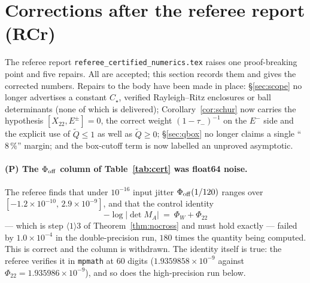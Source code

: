 \documentclass[11pt]{article}
\begin{document}
\section{Corrections after the referee report (RCr)}\label{sec:rcr}

The referee report \texttt{referee\_certified\_numerics.tex} raises one proof-breaking point and five
repairs.  All are accepted; this section records them and gives the corrected numbers.  Repairs to the
body have been made in place: \S\ref{sec:scope} no longer advertises a constant $C_\star$, verified
Rayleigh--Ritz enclosures or ball determinants (none of which is delivered);
Corollary~\ref{cor:schur} now carries the hypothesis $[X_{22},E^\pm]=0$, the correct weight
$(1-\tau_-)^{-1}$ on the $E^-$ side and the explicit use of $\widetilde Q\le1$ as well as
$\widetilde Q\ge0$; \S\ref{sec:qbox} no longer claims a single ``$8\,\%$'' margin; and the box-cutoff
term is now labelled an unproved asymptotic.

\paragraph{(P) The $\Phi_{\rm off}$ column of Table~\ref{tab:cert} was float64 noise.}  The referee
finds that under $10^{-16}$ input jitter $\Phi_{\rm off}(1/120)$ ranges over
$[-1.2\times10^{-10},\,2.9\times10^{-9}]$, and that the control identity
\begin{equation}\label{eq:ctrl}
 -\log\bigl|\det M_A\bigr|\ =\ \Phi_W+\Phi_{22}
\end{equation}
--- which is step $\langle1\rangle3$ of Theorem~\ref{thm:nocross} and must hold exactly --- failed by
$1.0\times10^{-4}$ in the double-precision run, $180$ times the quantity being computed.  This is
correct and the column is withdrawn.  The identity itself is true: the referee verifies it in
\texttt{mpmath} at $60$ digits ($1.9359858\times10^{-9}$ against $\Phi_{22}=1.935986\times10^{-9}$),
and so does the high-precision run below.
\end{document}
